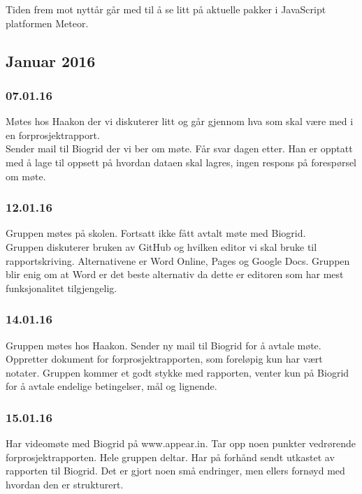 \documentclass[12pt, oneside]{article}
\begin{document}
Tiden frem mot nyttår går med til å se litt på aktuelle pakker i JavaScript platformen Meteor. 

\subsection{Januar 2016}
\subsubsection{07.01.16}
Møtes hos Haakon der vi diskuterer litt og går gjennom hva som skal være med i en forprosjektrapport.\\
Sender mail til Biogrid der vi ber om møte. Får svar dagen etter. Han er opptatt med å lage til oppsett på hvordan dataen skal lagres, ingen respons på forespørsel om møte.

\subsubsection{12.01.16}
Gruppen møtes på skolen. Fortsatt ikke fått avtalt møte med Biogrid. \\
Gruppen diskuterer bruken av GitHub og hvilken editor vi skal bruke til rapportskriving. Alternativene er Word Online, Pages og Google Docs. Gruppen blir enig om at Word er det beste alternativ da dette er editoren som har mest funksjonalitet tilgjengelig. 

\subsubsection{14.01.16}
Gruppen møtes hos Haakon. Sender ny mail til Biogrid for å avtale møte. \\
Oppretter dokument for forprosjektrapporten, som foreløpig kun har vært notater. Gruppen kommer et godt stykke med rapporten, venter kun på Biogrid for å avtale endelige betingelser, mål og lignende.

\subsubsection{15.01.16}
Har videomøte med Biogrid på www.appear.in. Tar opp noen punkter vedrørende forprosjektrapporten. Hele gruppen deltar. Har på forhånd sendt utkastet av rapporten til Biogrid. Det er gjort noen små endringer, men ellers fornøyd med hvordan den er strukturert. \\
\end{document}

